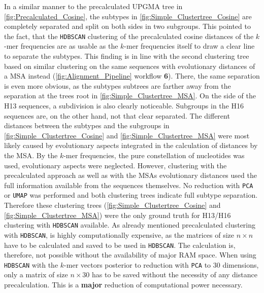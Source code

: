 In a similar manner to the precalculated \gls{UPGMA} tree in \autoref{fig:Precalculated_Cosine}, the subtypes in \autoref{fig:Simple_Clustertree_Cosine} are completely separated and split on both sides in two subgroups. This pointed to the fact, that the \texttt{HDBSCAN} clustering of the precalculated cosine distances of the $k$-mer frequencies are as usable as the $k$-mer frequencies itself to draw a clear line to separate the subtypes. This finding is in line with the second clustering tree based on similar clustering on the same sequences with evolutionary distances of a \gls{MSA} instead (\autoref{fig:Alignment_Pipeline} workflow \textsf{\textbf{6}}). There, the same separation is even more obvious, as the subtypes subtrees are farther away from the separation at the trees root in \autoref{fig:Simple_Clustertree_MSA}. On the side of the H13 sequences, a subdivision is also clearly noticeable. Subgroups in the H16 sequences are, on the other hand, not that clear separated. The different distances between the subtypes and the subgroups in \autoref{fig:Simple_Clustertree_Cosine} and \autoref{fig:Simple_Clustertree_MSA} were most likely caused by evolutionary aspects integrated in the calculation of distances by the \gls{MSA}. By the $k$-mer frequencies, the pure constellation of nucleotides was used, evolutionary aspects were neglected. However, clustering with the precalculated approach as well as with the \glspl{MSA} evolutionary distances used the full information available from the sequences themselves. No reduction with \texttt{PCA} or \texttt{UMAP} was performed and both clustering trees indicate full subtype separation. Therefore these clustering trees (\autoref{fig:Simple_Clustertree_Cosine} and \autoref{fig:Simple_Clustertree_MSA}) were the only ground truth for H13/H16 clustering with \texttt{HDBSCAN} available. As already mentioned precalculated clustering with \texttt{HDBSCAN}, is highly computationally expensive, as the matrices of size $n \times n$ have to be calculated and saved to be used in \texttt{HDBSCAN}. The calculation is, therefore, not possible without the availability of major RAM space. When using \texttt{HDBSCAN} with the $k$-mer vectors posterior to reduction with \texttt{PCA} to 30 dimensions, only a matrix of size $n\times 30$ has to be saved without the necessity of any distance precalculation. This is a \textbf{major} reduction of computational power necessary. 

\vspace{1em}

